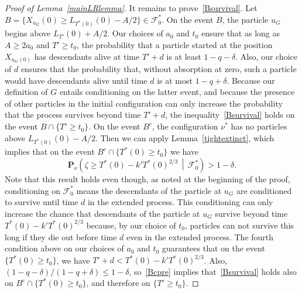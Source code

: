 \documentclass[AHL,Unicode,longabstracts,published]{cedram}
\renewcommand*\P{\mathbf{P}}
\newcommand\F{\mathcal{F}}
\newcommand{\1} {\mathds{1}}
\begin{document}
\begin{proof}[Proof of Lemma~\ref{mainLRlemma}]
It remains to prove~\eqref{Bsurvival}. Let $B = \{X_{u_G}(0) \geq L_{T^*(0)}(0) - A/2\} \in \F_0^*$. On the event $B$, the particle $u_G$ begins above $L_{T'}(0) + A/2$. Our choices of $a_0$ and $t_0$ ensure that as long as $A \geq 2 a_0$ and $T' \geq t_0$, the probability that a particle started at the position $X_{u_G(0)}$ has descendants alive at time $T' + d$ is at least $1 - q - \delta$. Also, our choice of $d$ ensures that the probability that, without absorption at zero, such a particle would have descendants alive until time $d$ is at most $1 - q + \delta$. Because our definition of $G$ entails conditioning on the latter event, and because the presence of other particles in the initial configuration can only increase the probability that the process survives beyond time $T' + d$, the inequality~\eqref{Bsurvival} holds on the event $B \cap \{T' \geq t_0\}$. On the event $B^c$, the configuration $\nu^*$ has no particles above $L_{T^*(0)}(0) - A/2$. Then we can apply Lemma~\ref{tightextinct}, which implies that on the event $B^c \cap \{T^*(0) \geq t_0\}$ we have
\begin{equation}\label{Bcpre}
\P_{\nu}\left(\zeta \geq T^*(0) - k' T^*(0)^{2/3} \,\middle|\, \F_0^*\right) > 1 - \delta.
\end{equation}
Note that this result holds even though, as noted at the beginning of the proof, conditioning on $\F_0^*$ means the descendants of the particle at $u_G$ are conditioned to survive until time $d$ in the extended process. This conditioning can only increase the chance that descendants of the particle at $u_G$ survive beyond time $T^*(0) - k' T^*(0)^{2/3}$ because, by our choice of $t_0$, particles can not survive this long if they die out before time $d$ even in the extended process. The fourth condition above on our choices of $a_0$ and $t_0$ guarantees that on the event $\{T^*(0) \geq t_0\}$, we have $T' + d < T^*(0) - k' T^*(0)^{2/3}$. Also, $(1 - q - \delta)/(1 - q + \delta) \leq 1 - \delta$, so~\eqref{Bcpre} implies that~\eqref{Bsurvival} holds also on $B^c \cap \{T^*(0) \geq t_0\}$, and therefore on $\{T' \geq t_0\}$.
\end{proof}
\end{document}
